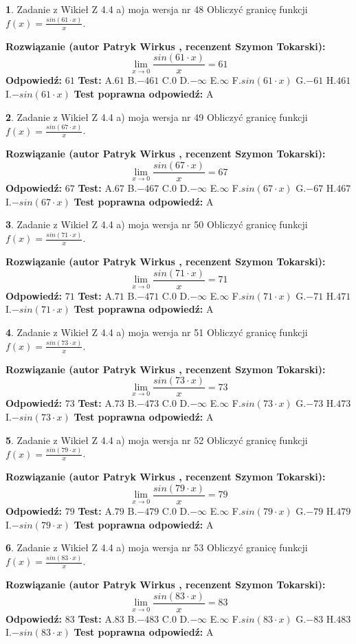 \documentclass[12pt, a4paper]{article}
\theoremstyle{definition} %
\newtheorem{zad}{}
\newcommand{\zadStart}[1]{\begin{zad}#1\newline}
\newcommand{\zadStop}{\end{zad}}
\newcommand{\rozwStart}[2]{\noindent \textbf{Rozwiązanie (autor #1 , recenzent #2): }\newline}
\newcommand{\rozwStop}{\newline}
\newcommand{\odpStart}{\noindent \textbf{Odpowiedź:}\newline}
\newcommand{\odpStop}{\newline}
\newcommand{\testStart}{\noindent \textbf{Test:}\newline}
\newcommand{\testStop}{\newline}
\newcommand{\kluczStart}{\noindent \textbf{Test poprawna odpowiedź:}\newline}
\newcommand{\kluczStop}{\newline}
\begin{document}
\zadStart{Zadanie z Wikieł Z 4.4 a) moja wersja nr 48}
Obliczyć granicę funkcji $f(x)=\frac{sin(61\cdot x)}{x}$.
\zadStop
\rozwStart{Patryk Wirkus}{Szymon Tokarski}
$$\lim\limits_{x\to 0}\frac{sin(61\cdot x)}{x}=
61$$
\rozwStop
\odpStart
$61$
\odpStop
\testStart
A.$61$
B.$-461$
C.$0$
D.$-\infty$
E.$\infty$
F.$sin(61\cdot x)$
G.$-61$
H.$461$
I.$-sin(61\cdot x)$
\testStop
\kluczStart
A
\kluczStop



\zadStart{Zadanie z Wikieł Z 4.4 a) moja wersja nr 49}
Obliczyć granicę funkcji $f(x)=\frac{sin(67\cdot x)}{x}$.
\zadStop
\rozwStart{Patryk Wirkus}{Szymon Tokarski}
$$\lim\limits_{x\to 0}\frac{sin(67\cdot x)}{x}=
67$$
\rozwStop
\odpStart
$67$
\odpStop
\testStart
A.$67$
B.$-467$
C.$0$
D.$-\infty$
E.$\infty$
F.$sin(67\cdot x)$
G.$-67$
H.$467$
I.$-sin(67\cdot x)$
\testStop
\kluczStart
A
\kluczStop



\zadStart{Zadanie z Wikieł Z 4.4 a) moja wersja nr 50}
Obliczyć granicę funkcji $f(x)=\frac{sin(71\cdot x)}{x}$.
\zadStop
\rozwStart{Patryk Wirkus}{Szymon Tokarski}
$$\lim\limits_{x\to 0}\frac{sin(71\cdot x)}{x}=
71$$
\rozwStop
\odpStart
$71$
\odpStop
\testStart
A.$71$
B.$-471$
C.$0$
D.$-\infty$
E.$\infty$
F.$sin(71\cdot x)$
G.$-71$
H.$471$
I.$-sin(71\cdot x)$
\testStop
\kluczStart
A
\kluczStop



\zadStart{Zadanie z Wikieł Z 4.4 a) moja wersja nr 51}
Obliczyć granicę funkcji $f(x)=\frac{sin(73\cdot x)}{x}$.
\zadStop
\rozwStart{Patryk Wirkus}{Szymon Tokarski}
$$\lim\limits_{x\to 0}\frac{sin(73\cdot x)}{x}=
73$$
\rozwStop
\odpStart
$73$
\odpStop
\testStart
A.$73$
B.$-473$
C.$0$
D.$-\infty$
E.$\infty$
F.$sin(73\cdot x)$
G.$-73$
H.$473$
I.$-sin(73\cdot x)$
\testStop
\kluczStart
A
\kluczStop



\zadStart{Zadanie z Wikieł Z 4.4 a) moja wersja nr 52}
Obliczyć granicę funkcji $f(x)=\frac{sin(79\cdot x)}{x}$.
\zadStop
\rozwStart{Patryk Wirkus}{Szymon Tokarski}
$$\lim\limits_{x\to 0}\frac{sin(79\cdot x)}{x}=
79$$
\rozwStop
\odpStart
$79$
\odpStop
\testStart
A.$79$
B.$-479$
C.$0$
D.$-\infty$
E.$\infty$
F.$sin(79\cdot x)$
G.$-79$
H.$479$
I.$-sin(79\cdot x)$
\testStop
\kluczStart
A
\kluczStop



\zadStart{Zadanie z Wikieł Z 4.4 a) moja wersja nr 53}
Obliczyć granicę funkcji $f(x)=\frac{sin(83\cdot x)}{x}$.
\zadStop
\rozwStart{Patryk Wirkus}{Szymon Tokarski}
$$\lim\limits_{x\to 0}\frac{sin(83\cdot x)}{x}=
83$$
\rozwStop
\odpStart
$83$
\odpStop
\testStart
A.$83$
B.$-483$
C.$0$
D.$-\infty$
E.$\infty$
F.$sin(83\cdot x)$
G.$-83$
H.$483$
I.$-sin(83\cdot x)$
\testStop
\kluczStart
A
\kluczStop
\end{document}
